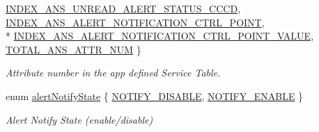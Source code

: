 \begin{DoxyCompactItemize}
\hyperlink{group___b_l_e___a_n_s_gga80f34b5cfd2798b30f32bd666c2f82e8a4f38cc856f2e3675acc6a62896597e3b}{I\+N\+D\+E\+X\+\_\+\+A\+N\+S\+\_\+\+U\+N\+R\+E\+A\+D\+\_\+\+A\+L\+E\+R\+T\+\_\+\+S\+T\+A\+T\+U\+S\+\_\+\+C\+C\+CD}, 
\hyperlink{group___b_l_e___a_n_s_gga80f34b5cfd2798b30f32bd666c2f82e8a5510d44e314809090a462fd40d30cefe}{I\+N\+D\+E\+X\+\_\+\+A\+N\+S\+\_\+\+A\+L\+E\+R\+T\+\_\+\+N\+O\+T\+I\+F\+I\+C\+A\+T\+I\+O\+N\+\_\+\+C\+T\+R\+L\+\_\+\+P\+O\+I\+NT}, 
\\*
\hyperlink{group___b_l_e___a_n_s_gga80f34b5cfd2798b30f32bd666c2f82e8af168d38b6bcc6ed4f4358ce245030442}{I\+N\+D\+E\+X\+\_\+\+A\+N\+S\+\_\+\+A\+L\+E\+R\+T\+\_\+\+N\+O\+T\+I\+F\+I\+C\+A\+T\+I\+O\+N\+\_\+\+C\+T\+R\+L\+\_\+\+P\+O\+I\+N\+T\+\_\+\+V\+A\+L\+UE}, 
\hyperlink{group___b_l_e___a_n_s_gga80f34b5cfd2798b30f32bd666c2f82e8a271e98c2f9ba5ff30d5259a3b746e0e6}{T\+O\+T\+A\+L\+\_\+\+A\+N\+S\+\_\+\+A\+T\+T\+R\+\_\+\+N\+UM}
 \}\begin{DoxyCompactList}\small\item\em Attribute number in the app defined Service Table. \end{DoxyCompactList}
\item 
enum \hyperlink{group___b_l_e___a_n_s_ga070e27685d9277855911bab2da81193e}{alert\+Notify\+State} \{ \hyperlink{group___b_l_e___a_n_s_gga070e27685d9277855911bab2da81193eab210d2305b05b39a04ae65f0adba0a2b}{N\+O\+T\+I\+F\+Y\+\_\+\+D\+I\+S\+A\+B\+LE}, 
\hyperlink{group___b_l_e___a_n_s_gga070e27685d9277855911bab2da81193eaa8f7536179be42b2c58e5a219618a82b}{N\+O\+T\+I\+F\+Y\+\_\+\+E\+N\+A\+B\+LE}
 \}\begin{DoxyCompactList}\small\item\em Alert Notify State (enable/disable) \end{DoxyCompactList}
\end{DoxyCompactItemize}
